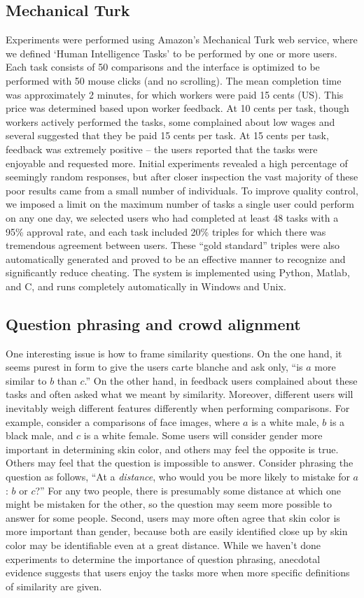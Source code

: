 \documentclass{article}
\begin{document}
\subsection{Mechanical Turk}
Experiments were performed using Amazon's Mechanical Turk web service,
where we defined `Human Intelligence Tasks' to be performed by one or
more users.  Each task consists of 50 comparisons and the interface is
optimized to be performed with 50 mouse clicks (and no scrolling).
The mean completion time was approximately 2 minutes, for which
workers were paid 15 cents (US).  This price was determined based upon
worker feedback.  At 10 cents per task, though workers actively
performed the tasks, some complained about low wages and several
suggested that they be paid 15 cents per task.  At 15 cents per task,
feedback was extremely positive -- the users reported that the tasks
were enjoyable and requested more.  Initial experiments revealed a
high percentage of seemingly random responses, but after closer
inspection the vast majority of these poor results came from a small
number of individuals.  To improve quality control, we imposed a limit
on the maximum number of tasks a single user could perform on any one
day, we selected users who had completed at least 48 tasks with a 95\%
approval rate, and each task included 20\% triples for which there was
tremendous agreement between users.  These ``gold standard'' triples
were also automatically generated and proved to be an effective manner
to recognize and significantly reduce cheating.  The system is
implemented using Python, Matlab, and C, and runs completely
automatically in Windows and Unix.

\subsection{Question phrasing and crowd alignment}
One interesting issue is how to frame similarity questions.  On the
one hand, it seems purest in form to give the users carte blanche and
ask only, ``is $a$ more similar to $b$ than $c$.''  On the other hand,
in feedback users complained about these tasks and often asked what we
meant by similarity.  Moreover, different users will inevitably weigh
different features differently when performing comparisons.  For
example, consider a comparisons of face images, where $a$ is a white
male, $b$ is a black male, and $c$ is a white female.  Some users will
consider gender more important in determining skin color, and others
may feel the opposite is true.  Others may feel that the question is
impossible to answer.  Consider phrasing the question as follows, ``At
a {\em distance}, who would you be more likely to mistake for $a$: $b$
or $c$?''  For any two people, there is presumably some distance at
which one might be mistaken for the other, so the question may seem
more possible to answer for some people.  Second, users may more often
agree that skin color is more important than gender, because both are
easily identified close up by skin color may be identifiable even at a
great distance.  While we haven't done experiments to determine the
importance of question phrasing, anecdotal evidence suggests that
users enjoy the tasks more when more specific definitions of
similarity are given.
\end{document}
